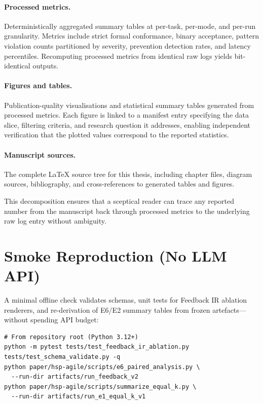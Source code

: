 \paragraph{Processed metrics.}
Deterministically aggregated summary tables at per-task, per-mode, and
per-run granularity.  Metrics include strict formal conformance,
binary acceptance, pattern violation counts partitioned by severity,
prevention detection rates, and latency percentiles.  Recomputing
processed metrics from identical raw logs yields bit-identical
outputs.

\paragraph{Figures and tables.}
Publication-quality visualisations and statistical summary tables
generated from processed metrics.  Each figure is linked to a manifest
entry specifying the data slice, filtering criteria, and research
question it addresses, enabling independent verification that the
plotted values correspond to the reported statistics.

\paragraph{Manuscript sources.}
The complete \LaTeX{} source tree for this thesis, including chapter
files, diagram sources, bibliography, and cross-references to
generated tables and figures.

This decomposition ensures that a sceptical reader can trace any reported
number from the manuscript back through processed metrics to the underlying
raw log entry without ambiguity.

\section{Smoke Reproduction (No LLM API)}
\label{sec:repro:smoke}

A minimal offline check validates schemas, unit tests for Feedback IR
ablation renderers, and re-derivation of E6/E2 summary tables from frozen
artefacts---without spending API budget:

\begin{verbatim}
# From repository root (Python 3.12+)
python -m pytest tests/test_feedback_ir_ablation.py tests/test_schema_validate.py -q
python paper/hsp-agile/scripts/e6_paired_analysis.py \
  --run-dir artifacts/run_feedback_v2
python paper/hsp-agile/scripts/summarize_equal_k.py \
  --run-dir artifacts/run_e1_equal_k_v1
\end{verbatim}

